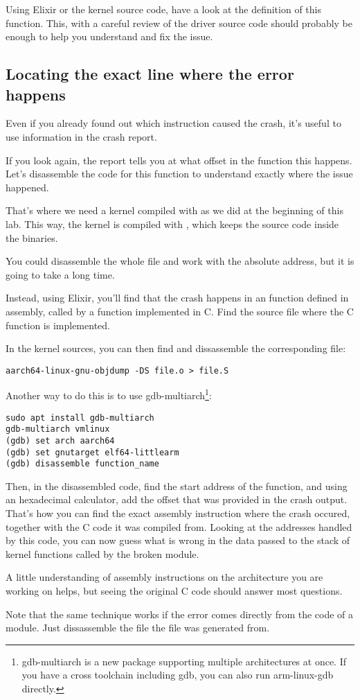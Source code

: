 Using Elixir or the kernel source code, have a look at the definition of this
function. This, with a careful review of the driver source code should
probably be enough to help you understand and fix the issue.

\subsection{Locating the exact line where the error happens}

Even if you already found out which instruction caused the crash, it's
useful to use information in the crash report.

If you look again, the report tells you at what offset in the function
this happens. Let's disassemble the code for this function to
understand exactly where the issue happened.

That's where we need a kernel compiled with 
as we did at the beginning of this lab. This way, the kernel is
compiled with , which keeps the source
code inside the binaries.

You could disassemble the whole  file and work with
the  absolute address, but it is going to take a long time.

Instead, using Elixir, you'll find that the crash happens in an function
defined in assembly, called by a function implemented in C. Find
the  source file where the C function is implemented.

In the kernel sources, you can then find
and dissassemble the corresponding  file:

\begin{verbatim}
aarch64-linux-gnu-objdump -DS file.o > file.S
\end{verbatim}

Another way to do this is to use {gdb-multiarch}\footnote{gdb-multiarch is a new package
supporting multiple architectures at once. If you have a cross
toolchain including gdb, you can also run arm-linux-gdb directly.}:

\begin{verbatim}
sudo apt install gdb-multiarch
gdb-multiarch vmlinux
(gdb) set arch aarch64
(gdb) set gnutarget elf64-littlearm
(gdb) disassemble function_name
\end{verbatim}

Then, in the disassembled code, find the start address of the
function, and using an hexadecimal calculator, add the offset that
was provided in the crash output. That's how you can find the
exact assembly instruction where the crash occured, together
with the C code it was compiled from. Looking at the addresses
handled by this code, you can now guess what is wrong in the
data passed to the stack of kernel functions called by the
broken module.

A little understanding of assembly instructions on the architecture
you are working on helps, but seeing the original C code should answer
most questions.

Note that the same technique works if the error comes directly from
the code of a module. Just dissassemble the  file
the  file was generated from.
